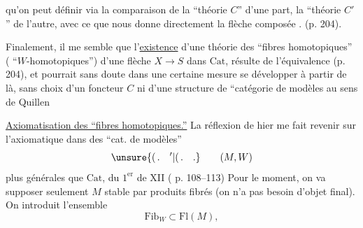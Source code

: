 
qu'on peut définir via la comparaison de la ``théorie $C$'' d'une part, la ``théorie $C'$'' de l'autre, avec ce que nous donne directement la flèche composée . (p. 204).

Finalement, il me semble que l'\uline{existence} d'une théorie des ``fibres homotopiques'' ( ``$W$-homotopiques'') d'une flèche $X\to S$ dans $\mathrm{Cat}$, résulte de l'équivalence  (p. 204), et  pourrait sans doute dans une certaine mesure se développer à partir de là, sans choix d'un foncteur $C$ ni d'une structure de ``catégorie de modèles au sens de Quillen

 \uline{Axiomatisation des ``fibres homotopiques.''} La réflexion de hier me fait revenir sur l'axiomatique dans des ``cat. de modèles''
\[
\unsure{(\,.\quad {}'|(\,.\quad .}\qquad(M,W)
\]
plus générales que $\mathrm{Cat}$, du $1^{\mathrm{er}}$  de XII ( p. 108--113) Pour le moment, on va supposer seulement $M$ stable par produits fibrés (on n'a pas besoin d'objet final). On introduit l'ensemble 
\[
\mathrm{Fib}_W\subset\mathrm{Fl}(M),
\]
